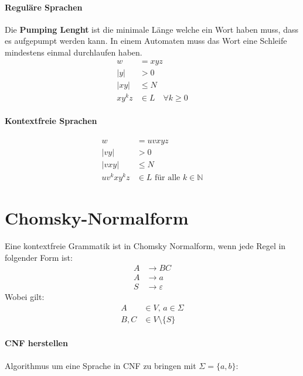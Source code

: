 \paragraph{Reguläre Sprachen} Die \textbf{Pumping Lenght} ist die minimale Länge welche ein Wort haben muss, dass es aufgepumpt werden kann. In einem Automaten muss das Wort eine Schleife mindestens einmal durchlaufen haben.
\begin{align*}
    w &= xyz \\
    |y| &> 0 \\
    |xy| &\leq N \\
    xy^kz &\in L \quad \forall k \geq 0
\end{align*}
\paragraph{Kontextfreie Sprachen} 
\begin{align*}
    w &= uvxyz \\
    \vert vy \vert &> 0 \\
    \vert vxy \vert &\leq N\\
    uv^kxy^kz &\in L \text{ für alle } k \in \mathbb{N}
\end{align*}
\section*{Chomsky-Normalform} Eine kontextfreie Grammatik ist in Chomsky Normalform, wenn jede Regel in folgender Form ist:
\begin{align*}
    A &\rightarrow BC \\
    A &\rightarrow a \\
    S &\rightarrow \varepsilon
\end{align*}
Wobei gilt: 
\begin{align*}
    A &\in V ,\, a \in \Sigma \\
    B,C &\in V \setminus \{S\} 
\end{align*}
\paragraph{CNF herstellen} Algorithmus um eine Sprache in CNF zu bringen mit \(\Sigma = \{a, b\}\):
\begin{comment}
  \begin{align*}
    S &\rightarrow ASA \mid aB \\
    A &\rightarrow B \mid S \\
    B &\rightarrow b \mid \varepsilon
\end{align*}
\end{comment}

